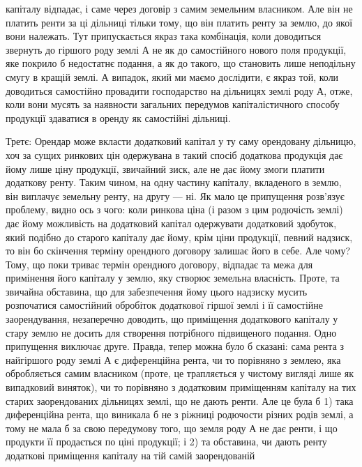 \parcont{}  %
капіталу відпадає, і саме через договір з самим земельним власником. Але він не платить
ренти за ці дільниці тільки тому, що він платить ренту за землю, до
якої вони належать. Тут припускається якраз така комбінація, коли доводиться
звернуть до гіршого роду землі А не як до самостійного нового поля продукції,
яке покрило б недостатнє подання, а як до такого, що становить лише
неподільну смугу в кращій землі. А випадок, який ми маємо дослідити, є якраз той,
коли доводиться самостійно провадити господарство на дільницях землі роду А,
отже, коли вони мусять за наявности загальних передумов капіталістичного способу
продукції здаватися в оренду як самостійні дільниці.

Третє: Орендар може вкласти додатковий капітал у ту саму орендовану
дільницю, хоч за сущих ринкових цін одержувана в такий спосіб додаткова
продукція дає йому лише ціну продукції, звичайний зиск, але не дає йому
змоги платити додаткову ренту. Таким чином, на одну частину капіталу, вкладеного
в землю, він виплачує земельну ренту, на другу — ні. Як мало це припущення
розв’язує проблему, видно ось з чого: коли ринкова ціна (і разом
з цим родючість землі) дає йому можливість на додатковий капітал одержувати
додатковий здобуток, який подібно до старого капіталу дає йому, крім ціни продукції,
певний надзиск, то він бо скінчення терміну орендного договору залишає
його в себе. Але чому? Тому, що поки триває термін орендного договору, відпадає
та межа для примінення його капіталу у землю, яку створює земельна
власність. Проте, та звичайна обставина, що для забезпечення йому цього надзиску
мусить розпочатися самостійний обробіток додаткової гіршої землі і її самостійне
заорендування, незаперечно доводить, що приміщення додаткового капіталу
у стару землю не досить для створення потрібного підвищеного подання.
Одно припущення виключає друге. Правда, тепер можна було б сказані: сама
рента з найгіршого роду землі А є диференційна рента, чи то порівняно з землею,
яка обробляється самим власником (проте, це трапляється у чистому вигляді
лише як випадковий виняток), чи то порівняно з додатковим приміщенням
капіталу на тих старих заорендованих дільницях землі, що не дають ренти.
Але це була б 1) така диференційна рента, що виникала б не з ріжниці родючости
різних родів землі, а тому не мала б за свою передумову того, що земля
роду А не дає ренти, і що продукти її продається по ціні продукції; і 2) та обставина,
чи дають ренту додаткові приміщення капіталу на тій самій заорендованій
